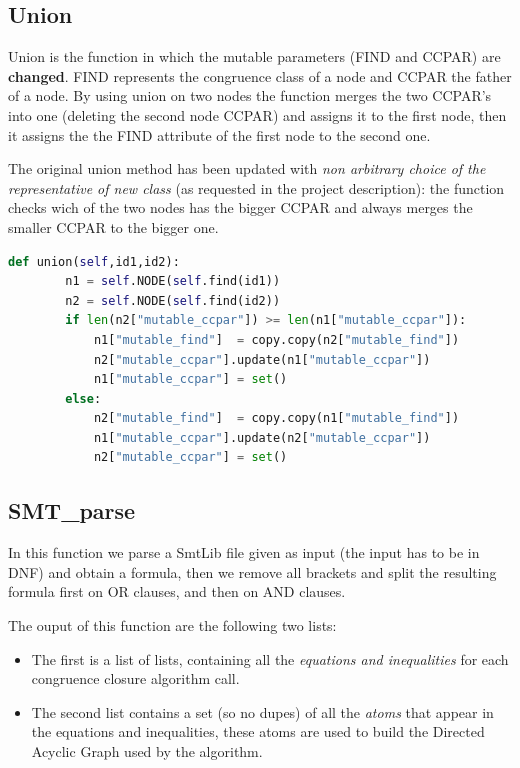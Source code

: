\documentclass[a4paper]{article}
\begin{document}
\subsection{Union}
Union is the function in which the mutable parameters (FIND and CCPAR) are \textbf{changed}. FIND represents the congruence class of a node and CCPAR the father of a node. By using union on two nodes the function merges the two CCPAR's into one (deleting the second node CCPAR) and assigns it to the first node, then it assigns the the FIND attribute of the first node to the second one.

\noindent
The original union method has been updated with \textit{non arbitrary choice of the representative of new class} (as requested in the project description): the function checks wich of the two nodes has the bigger CCPAR and always merges the smaller CCPAR to the bigger one. 
\begin{lstlisting}[language=Python,caption=Union function (with Priority)]
    def union(self,id1,id2):
        n1 = self.NODE(self.find(id1))
        n2 = self.NODE(self.find(id2))
        if len(n2["mutable_ccpar"]) >= len(n1["mutable_ccpar"]):
            n1["mutable_find"]  = copy.copy(n2["mutable_find"])
            n2["mutable_ccpar"].update(n1["mutable_ccpar"])
            n1["mutable_ccpar"] = set()
        else:
            n2["mutable_find"]  = copy.copy(n1["mutable_find"])
            n1["mutable_ccpar"].update(n2["mutable_ccpar"])
            n2["mutable_ccpar"] = set()
\end{lstlisting}

\subsection{SMT\_parse}
In this function we parse a SmtLib file given as input (the input has to be in DNF) and obtain a formula, then we remove all brackets and split the resulting formula first on OR clauses, and then on AND clauses. 

\noindent
The ouput of this function are the following two lists:
\begin{itemize}
    \item The first is a list of lists, containing all the \textit{equations and inequalities} for each congruence closure algorithm call.
    \item The second list contains a set (so no dupes) of all the \textit{atoms} that appear in the equations and inequalities, these atoms are used to build the Directed Acyclic Graph used by the algorithm.
\end{itemize}
\noindent
\end{document}
